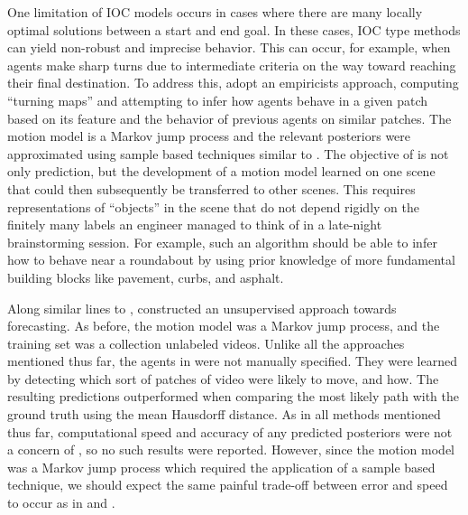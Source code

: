 \documentclass[letterpaper,10pt,conference]{ieeeconf}
\begin{document}
One limitation of IOC models occurs in cases where there are many locally optimal solutions between a start and end goal.
In these cases, IOC type methods can yield non-robust and imprecise behavior.
This can occur, for example, when agents make sharp turns due to intermediate criteria on the way toward reaching their final destination.
To address this, \cite{Ballan2016} adopt an empiricists approach, computing ``turning maps'' and attempting to infer how agents behave in a given patch based on its feature and the behavior of previous agents on similar patches.
The motion model is a Markov jump process and the relevant posteriors were approximated using sample based techniques similar to \cite{Karasev2016}.
The objective of \cite{Ballan2016} is not only prediction, but the development of a motion model learned on one scene that could then subsequently be transferred to other scenes. 
This requires representations of ``objects'' in the scene that do not depend rigidly on the finitely many labels an engineer managed to think of in a late-night brainstorming session.
For example, such an algorithm should be able to infer how to behave near a roundabout by using prior knowledge of more fundamental building blocks like pavement, curbs, and asphalt.

Along similar lines to \cite{Ballan2016}, \cite{Walker2014} constructed an unsupervised approach towards forecasting.
As before, the motion model was a Markov jump process, and the training set was a collection unlabeled videos.
Unlike all the approaches mentioned thus far, the agents in \cite{Walker2014} were not manually specified.
They were learned by detecting which sort of patches of video were likely to move, and how.
The resulting predictions outperformed \cite{Kitani2012} when comparing the most likely path with the ground truth using the mean Hausdorff distance.
As in all methods mentioned thus far, computational speed and accuracy of any predicted posteriors were not a concern of \cite{Walker2014}, so no such results were reported.
However, since the motion model was a Markov jump process which required the application of a sample based technique, we should expect the same painful trade-off between error and speed to occur as in \cite{Karasev2016} and \cite{Ballan2016}.
\end{document}
